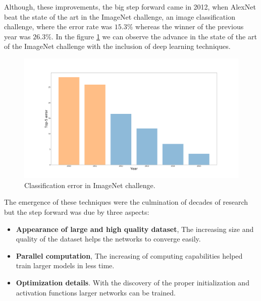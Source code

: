 Although, these improvements, the big step forward came in 2012, when AlexNet \cite{alexnet} beat the state of the art in the ImageNet challenge, an image classification challenge, where the error rate was $15.3 \%$ whereas the winner of the previous year was $26.3 \%$. In the figure \ref{intro2} we can observe the advance in the state of the art of the ImageNet challenge with the inclusion of deep learning techniques.




\begin{figure}[H]
\centering         
\includegraphics[width=0.7\linewidth]{intro/iamgeWihtou.png}
\caption{Classification error in ImageNet challenge.} \label{intro2}
\end{figure}



The emergence of these techniques were the culmination of decades of research but the step forward was due by three aspects:

\begin{itemize}

\item \textbf{Appearance of large and high quality dataset}, The increasing size and quality of the dataset helps the networks to converge easily.

\item \textbf{Parallel computation}, The increasing of computing capabilities helped train larger models in less time.

\item \textbf{Optimization details}. With the discovery of the proper initialization and activation functions larger networks can be trained.


\end{itemize}












